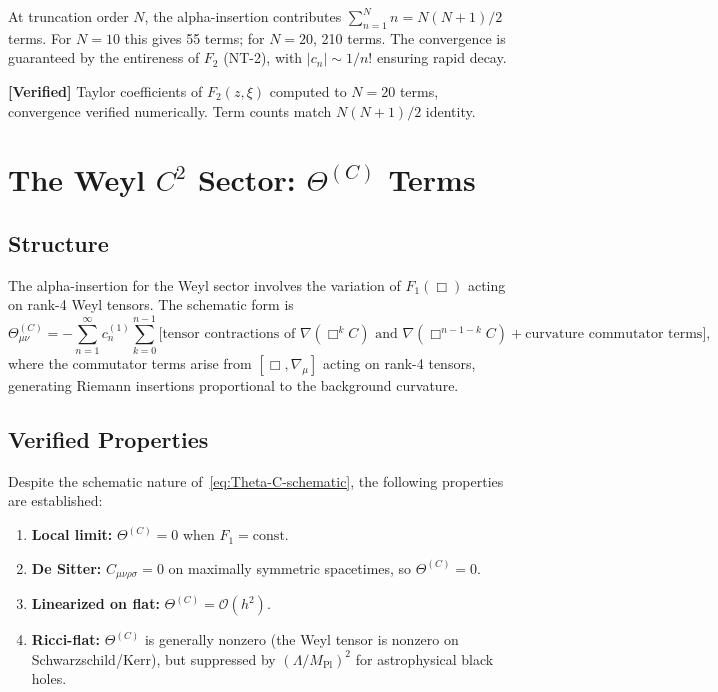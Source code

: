 \documentclass[11pt,a4paper]{article}
\theoremstyle{plain}
\theoremstyle{definition}
\newcommand{\verified}[1]{%
  \par\smallskip\noindent
  \colorbox{green!10}{\parbox{\dimexpr\linewidth-2\fboxsep}{%
    \textcolor{green!50!black}{\textbf{[Verified]}} #1}}%
  \par\smallskip}
\begin{document}
At truncation order $N$, the alpha-insertion contributes
$\sum_{n=1}^{N} n = N(N+1)/2$ terms. For $N = 10$ this gives 55 terms;
for $N = 20$, 210 terms. The convergence is guaranteed by the
entireness of $F_2$ (NT-2), with $|c_n| \sim 1/n!$ ensuring rapid decay.

\verified{Taylor coefficients of $F_2(z,\xi)$ computed to $N = 20$
terms, convergence verified numerically. Term counts match
$N(N+1)/2$ identity.}

\section{The Weyl $C^2$ Sector: $\Theta^{(C)}$ Terms}
\label{sec:theta-C}

\subsection{Structure}

The alpha-insertion for the Weyl sector involves the variation of
$F_1(\Box)$ acting on rank-4 Weyl tensors. The schematic form is
\begin{equation}\label{eq:Theta-C-schematic}
  \Theta^{(C)}_{\mu\nu} = -\sum_{n=1}^{\infty} c_n^{(1)}
  \sum_{k=0}^{n-1}
  \bigl[\text{tensor contractions of }
  \nabla(\Box^k C)\text{ and }\nabla(\Box^{n-1-k} C)
  + \text{curvature commutator terms}\bigr],
\end{equation}
where the commutator terms arise from $[\Box, \nabla_\mu]$ acting on
rank-4 tensors, generating Riemann insertions proportional to the
background curvature.

\subsection{Verified Properties}

Despite the schematic nature of~\eqref{eq:Theta-C-schematic}, the
following properties are established:

\begin{enumerate}[nosep]
  \item \textbf{Local limit:} $\Theta^{(C)} = 0$ when $F_1 = \mathrm{const}$.
  \item \textbf{De Sitter:} $C_{\mu\nu\rho\sigma} = 0$ on maximally
    symmetric spacetimes, so $\Theta^{(C)} = 0$.
  \item \textbf{Linearized on flat:} $\Theta^{(C)} = \mathcal{O}(h^2)$.
  \item \textbf{Ricci-flat:} $\Theta^{(C)}$ is generally nonzero
    (the Weyl tensor is nonzero on Schwarzschild/Kerr), but suppressed
    by $(\Lambda/M_{\mathrm{Pl}})^2$ for astrophysical black holes.
\end{enumerate}
\end{document}
